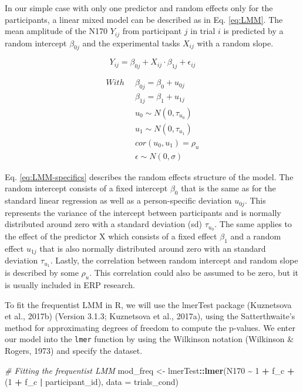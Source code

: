 \documentclass[
  doc,12pt,floatsintext]{apa7}
\newenvironment{Shaded}{\begin{snugshade}}{\end{snugshade}}
\newcommand{\AttributeTok}[1]{\textcolor[rgb]{0.13,0.29,0.53}{#1}}
\newcommand{\CommentTok}[1]{\textcolor[rgb]{0.56,0.35,0.01}{\textit{#1}}}
\newcommand{\DecValTok}[1]{\textcolor[rgb]{0.00,0.00,0.81}{#1}}
\newcommand{\FunctionTok}[1]{\textcolor[rgb]{0.13,0.29,0.53}{\textbf{#1}}}
\newcommand{\NormalTok}[1]{#1}
\newcommand{\OtherTok}[1]{\textcolor[rgb]{0.56,0.35,0.01}{#1}}
\newcommand{\SpecialCharTok}[1]{\textcolor[rgb]{0.81,0.36,0.00}{\textbf{#1}}}
\begin{document}
In our simple case with only one predictor and random effects only for the participants, a linear mixed model can be described as in Eq. \eqref{eq:LMM}. The mean amplitude of the N170 \(Y_{ij}\) from participant \(j\) in trial \(i\) is predicted by a random intercept \(\beta_{0j}\) and the experimental tasks \(X_{ij}\) with a random slope.

\begin{equation} 
Y_{ij} = \beta_{0j} + X_{ij} \cdot \beta_{1j} + \epsilon_{ij}
\label{eq:LMM}
\end{equation}

\begin{equation} 
\begin{split}
With \enspace & \beta_{0j} = \beta_{0} + u_{0j} \\
& \beta_{1j} = \beta_{1} + u_{1j} \\
& u_0 \sim N(0, \tau_{u_0}) \\
& u_1 \sim N(0, \tau_{u_1}) \\
& cor(u_0, u_1) = \rho_u \\
& \epsilon \sim N(0, \sigma)
\end{split}
\label{eq:LMM-specifics}
\end{equation}

Eq. \eqref{eq:LMM-specifics} describes the random effects structure of the model. The random intercept consists of a fixed intercept \(\beta_{0}\) that is the same as for the standard linear regression as well as a person-specific deviation \(u_{0j}\). This represents the variance of the intercept between participants and is normally distributed around zero with a standard deviation (sd) \(\tau_{u_0}\). The same applies to the effect of the predictor X which consists of a fixed effect \(\beta_{1}\) and a random effect \(u_{1j}\) that is also normally distributed around zero with an standard deviation \(\tau_{u_1}\). Lastly, the correlation between random intercept and random slope is described by some \(\rho_u\). This correlation could also be assumed to be zero, but it is usually included in ERP research.

To fit the frequentist LMM in R, we will use the lmerTest package (Kuznetsova et al., 2017b) (Version 3.1.3; Kuznetsova et al., 2017a), using the Satterthwaite's method for approximating degrees of freedom to compute the p-values. We enter our model into the \texttt{lmer} function by using the Wilkinson notation (Wilkinson \& Rogers, 1973) and specify the dataset.

\begin{Shaded}
\begin{Highlighting}[]
\CommentTok{\# Fitting the frequentist LMM}
\NormalTok{mod\_freq }\OtherTok{\textless{}{-}}\NormalTok{ lmerTest}\SpecialCharTok{::}\FunctionTok{lmer}\NormalTok{(N170 }\SpecialCharTok{\textasciitilde{}} \DecValTok{1} \SpecialCharTok{+}\NormalTok{ f\_c }\SpecialCharTok{+}\NormalTok{ (}\DecValTok{1} \SpecialCharTok{+}\NormalTok{ f\_c }\SpecialCharTok{|}\NormalTok{ participant\_id), }
                           \AttributeTok{data =}\NormalTok{ trials\_cond)}
\end{Highlighting}
\end{Shaded}
\end{document}
